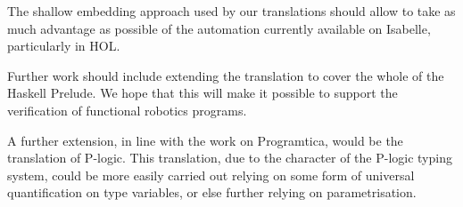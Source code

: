 \documentclass[a4paper,12pt]{article}
\begin{document}
The shallow embedding approach used by our translations should allow
to take as much advantage as possible of the automation currently
available on Isabelle, particularly in HOL. 

Further work should include extending the translation to cover the
whole of the Haskell Prelude. We hope that this will make it possible
to support the verification of functional robotics programs.

A further extension, in line with the work on Programtica, would be
the translation of P-logic. This translation, due to the character of
the P-logic typing system, could be more easily carried out relying on
some form of universal quantification on type variables, or else
further relying on parametrisation.




\end{document}
